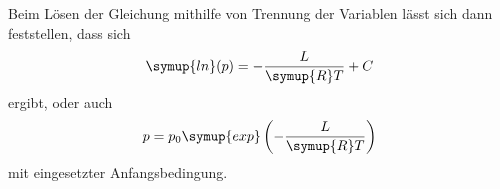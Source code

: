 \noindent Beim Lösen der Gleichung mithilfe von Trennung der Variablen lässt sich dann feststellen, dass sich
\begin{equation*}
    \symup{ln}(p)=-\frac{L}{\symup{R}T}+C
\end{equation*}
ergibt, oder auch
\begin{equation}
    p=p_0 \symup{exp} \left(-\frac{L}{\symup{R}T}\right)
    \label{eqn:druck}
\end{equation}
mit eingesetzter Anfangsbedingung.



